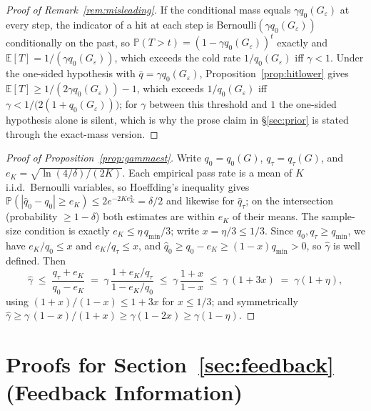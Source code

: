\documentclass{article}
\theoremstyle{plain}
\theoremstyle{definition}
\theoremstyle{remark}
\newcommand{\E}{\mathbb{E}}
\renewcommand{\P}{\mathbb{P}}
\newcommand{\eps}{\varepsilon}
\begin{document}
\begin{proof}[Proof of Remark~\ref{rem:misleading}]
If the conditional mass equals $\gamma q_0(G_\eps)$ at every step, the indicator of a hit at each step is Bernoulli$(\gamma q_0(G_\eps))$ conditionally on the past, so $\P(T > t) = (1 - \gamma q_0(G_\eps))^t$ exactly and $\E[T] = 1/(\gamma q_0(G_\eps))$, which exceeds the cold rate $1/q_0(G_\eps)$ iff $\gamma < 1$. Under the one-sided hypothesis with $\bar q = \gamma q_0(G_\eps)$, Proposition~\ref{prop:hitlower} gives $\E[T] \ge 1/(2\gamma q_0(G_\eps)) - 1$, which exceeds $1/q_0(G_\eps)$ iff $\gamma < 1/\big(2(1 + q_0(G_\eps))\big)$; for $\gamma$ between this threshold and $1$ the one-sided hypothesis alone is silent, which is why the prose claim in \S\ref{sec:prior} is stated through the exact-mass version.
\end{proof}

\begin{proof}[Proof of Proposition~\ref{prop:gammaest}]
Write $q_0 = q_0(G)$, $q_\tau = q_\tau(G)$, and $e_K = \sqrt{\ln(4/\delta)/(2K)}$. Each empirical pass rate is a mean of $K$ i.i.d.\ Bernoulli variables, so Hoeffding's inequality \citep{hoeffding1963probability} gives $\P(|\hat q_0 - q_0| \ge e_K) \le 2e^{-2Ke_K^2} = \delta/2$ and likewise for $\hat q_\tau$; on the intersection (probability $\ge 1 - \delta$) both estimates are within $e_K$ of their means. The sample-size condition is exactly $e_K \le \eta\, q_{\min}/3$; write $x = \eta/3 \le 1/3$. Since $q_0, q_\tau \ge q_{\min}$, we have $e_K/q_0 \le x$ and $e_K/q_\tau \le x$, and $\hat q_0 \ge q_0 - e_K \ge (1-x)q_{\min} > 0$, so $\hat\gamma$ is well defined. Then
\[
\hat\gamma \;\le\; \frac{q_\tau + e_K}{q_0 - e_K} \;=\; \gamma\,\frac{1 + e_K/q_\tau}{1 - e_K/q_0} \;\le\; \gamma\,\frac{1+x}{1-x} \;\le\; \gamma\,(1 + 3x) \;=\; \gamma(1+\eta),
\]
using $(1+x)/(1-x) \le 1 + 3x$ for $x \le 1/3$; and symmetrically
$\hat\gamma \ge \gamma\,(1-x)/(1+x) \ge \gamma(1 - 2x) \ge \gamma(1 - \eta)$.
\end{proof}

\section{Proofs for Section~\ref{sec:feedback} (Feedback Information)}
\label{app:feedback}
\end{document}
